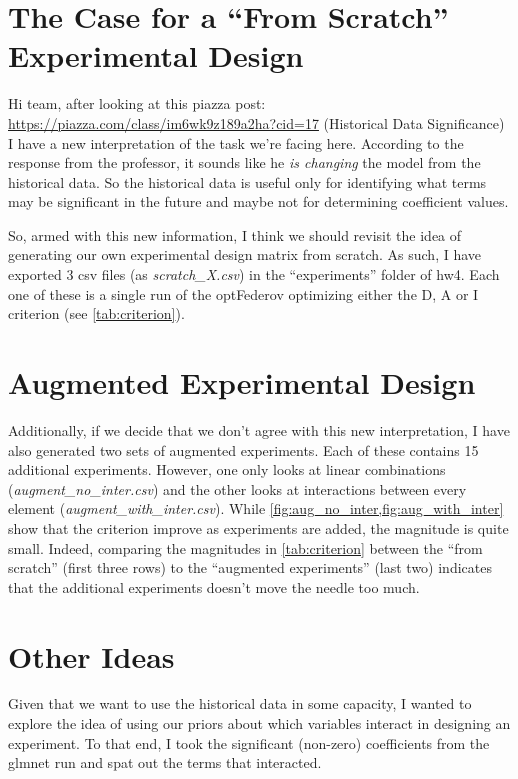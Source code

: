 



\section{The Case for a ``From Scratch'' Experimental Design}

Hi team, after looking at this piazza post: \url{https://piazza.com/class/im6wk9z189a2ha?cid=17} (Historical Data Significance) I have a new interpretation of the task we're facing here.  According to the response from the professor, it sounds like he \emph{is changing} the model from the historical data.  So the historical data is useful only for identifying what terms may be significant in the future and maybe not for determining coefficient values.

So, armed with this new information, I think we should revisit the idea of generating our own experimental design matrix from scratch.  As such, I have exported 3 csv files (as \textit{scratch\_X.csv}) in the ``experiments'' folder of hw4.  Each one of these is a single run of the optFederov optimizing either the D, A or I criterion (see \vref{tab:criterion}).


\section{Augmented Experimental Design}
Additionally, if we decide that we don't agree with this new interpretation, I have also generated two sets of augmented experiments.  Each of these contains 15 additional experiments.  However, one only looks at linear combinations (\textit{augment\_no\_inter.csv}) and the other looks at interactions between every element (\textit{augment\_with\_inter.csv}).  While \vref{fig:aug_no_inter,fig:aug_with_inter} show that the criterion improve as experiments are added, the magnitude is quite small.  Indeed, comparing the magnitudes in \vref{tab:criterion} between the ``from scratch'' (first three rows) to the ``augmented experiments'' (last two) indicates that the additional experiments doesn't move the needle too much.



\section{Other Ideas}
Given that we want to use the historical data in some capacity, I wanted to explore the idea of using our priors about which variables interact in designing an experiment.  To that end, I took the significant (non-zero) coefficients from the glmnet run and spat out the terms that interacted.

